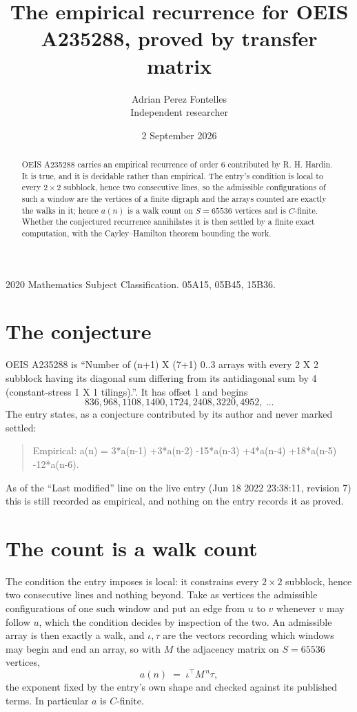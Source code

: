 \documentclass[11pt,a4paper]{article}
\title{The empirical recurrence for OEIS A235288, proved by transfer matrix}
\author{Adrian Perez Fontelles\\ \small Independent researcher}
\date{2 September 2026}
\theoremstyle{plain}
\theoremstyle{definition}
\begin{document}
\maketitle

\begin{abstract}
OEIS A235288 carries an empirical recurrence of order $6$ contributed by R. H. Hardin. It is
true, and it is decidable rather than empirical. The entry's condition is local to every $2\times2$ subblock, hence two consecutive lines, so
the admissible configurations of such a window are the vertices of a finite digraph and the
arrays counted are exactly the walks in it; hence $a(n)$ is a walk count on $S=65536$ vertices
and is $C$-finite. Whether the conjectured recurrence annihilates it is then settled by a
finite exact computation, with the Cayley--Hamilton theorem bounding the work.
\end{abstract}

\noindent\small 2020 Mathematics Subject Classification. 05A15, 05B45, 15B36.\normalsize

\section{The conjecture}

OEIS A235288 is ``Number of (n+1) X (7+1) 0..3 arrays with every 2 X 2 subblock having its diagonal sum differing from its antidiagonal sum by 4 (constant-stress 1 X 1 tilings).''. It has offset $1$ and begins
\[
836, 968, 1108, 1400, 1724, 2408, 3220, 4952,\ \dots
\]
The entry states, as a conjecture contributed by its author and never marked settled:
\begin{quote}
Empirical: a(n) = 3*a(n-1) +3*a(n-2) -15*a(n-3) +4*a(n-4) +18*a(n-5) -12*a(n-6).
\end{quote}
As of the ``Last modified'' line on the live entry (Jun 18 2022 23:38:11, revision 7) this is still
recorded as empirical, and nothing on the entry records it as proved.

\section{The count is a walk count}

The condition the entry imposes is local: it constrains every $2\times2$ subblock, hence two consecutive lines and nothing beyond. Take as vertices the admissible configurations of one such window and put an edge from $u$ to $v$ whenever $v$ may follow $u$, which the condition decides by inspection of the two.
An admissible array is then exactly a walk, and $\iota,\tau$ are the vectors recording which windows may begin and end an array, so with $M$ the adjacency matrix on $S=65536$ vertices,
\[
a(n)\;=\;\iota^{\!\top}M^{\,n}\tau ,
\]
the exponent fixed by the entry's own shape and checked against its published terms. In
particular $a$ is $C$-finite.
\end{document}
